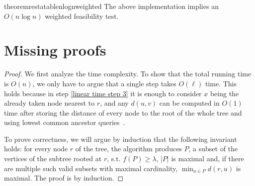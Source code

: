 \documentclass[a4paper,UKenglish]{lipics-v2016}
\theoremstyle{plain}
\begin{document}
\begin{restatable}{theoremrestatable}{nlognweighted}
\label{nlogn weighted f.t. theorem}
The above implementation implies an $O(n \log n)$ weighted feasibility test.
\end{restatable}



\newpage
\appendix

\section{Missing proofs}\label{appendix missing proofs}

\lineartimecorrectness*
\begin{proof}
We first analyze the time complexity. To show that the total running time is $O(n)$, we only have to argue that a single step
takes $O(\ell)$ time. This holds because in step \ref{linear time step 3} it is enough to consider $x$ being the already taken
node nearest to $r$, and any $d(u,v)$ can be computed in $O(1)$ time after storing the distance of every node to the root of the
whole tree and using lowest common ancestor queries~\cite{Bender2000}.

To prove correctness, we will argue by induction that the following invariant holds: for every node $r$ of the tree, the algorithm
produces $P$, a subset of the vertices of the subtree rooted at $r$, s.t. $f(P)\geq\lambda$, $|P|$ is maximal and, if there are multiple
such valid subsets with maximal cardinality, $\min_{u\in P} d(r,u)$ is maximal. The proof is by induction.


\end{proof}
\end{document}

